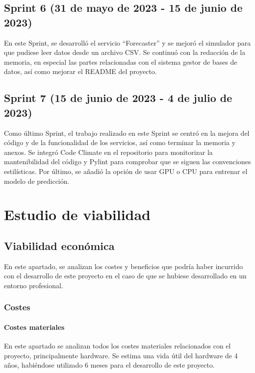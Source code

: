 
\subsection{Sprint 6 (31 de mayo de 2023 - 15 de junio de 2023)}

En este Sprint, se desarrolló el servicio ``Forecaster'' y se mejoró el simulador para que pudiese leer datos 
desde un archivo CSV. Se continuó con la redacción de la memoria, en especial las partes relacionadas con el 
sistema gestor de bases de datos, así como mejorar el README del proyecto.


\subsection{Sprint 7 (15 de junio de 2023 - 4 de julio de 2023)}

Como último Sprint, el trabajo realizado en este Sprint se centró en la mejora del código y de la funcionalidad 
de los servicios, así como terminar la memoria y anexos. Se integró Code Climate en el repositorio para monitorizar 
la mantenibilidad del código y Pylint para comprobar que se siguen las convenciones estilísticas. Por último, se 
añadió la opción de usar GPU o CPU para entrenar el modelo de predicción.


\section{Estudio de viabilidad}

\subsection{Viabilidad económica}

En este apartado, se analizan los costes y beneficios que podría haber incurrido con el desarrollo 
de este proyecto en el caso de que se hubiese desarrollado en un entorno profesional.

\subsubsection{Costes}

\paragraph{Costes materiales}
En este apartado se analizan todos los costes materiales relacionados con el proyecto, principalmente 
hardware. Se estima una vida útil del hardware de 4 años, habiéndose utilizado 6 meses para 
el desarrollo de este proyecto.

